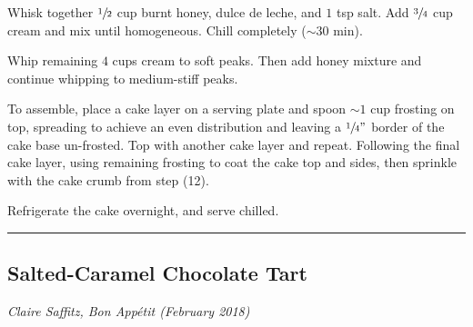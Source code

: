 \documentclass[10pt,a4paper]{article}
\begin{document}
{\begin{minipage}{0.66\linewidth}
\begin{exe}
    \item Whisk together $\sfrac{1}{2}$ cup burnt honey, dulce de leche, and $1$ tsp salt. Add $\sfrac{3}{4}$ cup cream and mix until homogeneous. Chill completely ($\sim30$ min).
    \item Whip remaining $4$ cups cream to soft peaks. Then add honey mixture and continue whipping to medium-stiff peaks.
    \item To assemble, place a cake layer on a serving plate and spoon $\sim1$ cup frosting on top, spreading to achieve an even distribution and leaving a $\sfrac{1}{4}"$ border of the cake base un-frosted. Top with another cake layer and repeat. Following the final cake layer, using remaining frosting to coat the cake top and sides, then sprinkle with the cake crumb from step (12).
    \item Refrigerate the cake overnight, and serve chilled.
\end{exe}
\end{minipage}}
\vskip 0.025in
\rule{\textwidth}{0.4pt}
\vfill

\subsection{Salted-Caramel Chocolate Tart}
\textit{Claire Saffitz, Bon Appétit (February 2018)}
\end{document}
